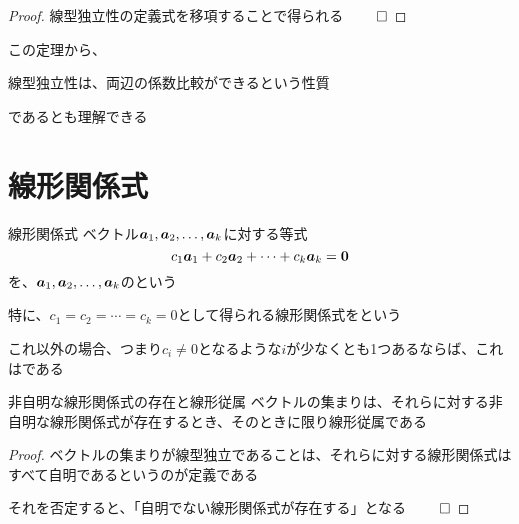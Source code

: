 \documentclass[../../../topic_linear-algebra]{subfiles}
\begin{document}
\begin{proof}
  線型独立性の定義式を移項することで得られる $\qed$
\end{proof}

この定理から、
\begin{shaded}
  線型独立性は、両辺の係数比較ができるという性質
\end{shaded}
であるとも理解できる

\sectionline
\section{線形関係式}

\begin{definition}{線形関係式}
  ベクトル$\vb*{a}_1, \vb*{a}_2, \dots, \vb*{a}_k$に対する等式
  \begin{equation*}
    c_1 \vb*{a}_1 + c_2 \vb*{a}_2 + \cdots + c_k \vb*{a}_k = \vb*{0}
  \end{equation*}
  を、$\vb*{a}_1, \vb*{a}_2, \dots, \vb*{a}_k$のという
\end{definition}

特に、$c_1 = c_2 = \cdots = c_k = 0$として得られる線形関係式をという

これ以外の場合、つまり$c_i \neq 0$となるような$i$が少なくとも1つあるならば、これはである

\begin{theorem}{非自明な線形関係式の存在と線形従属}
  ベクトルの集まりは、それらに対する非自明な線形関係式が存在するとき、そのときに限り線形従属である
\end{theorem}

\begin{proof}
  ベクトルの集まりが線型独立であることは、それらに対する線形関係式はすべて自明であるというのが定義である

  それを否定すると、「自明でない線形関係式が存在する」となる $\qed$
\end{proof}
\end{document}
